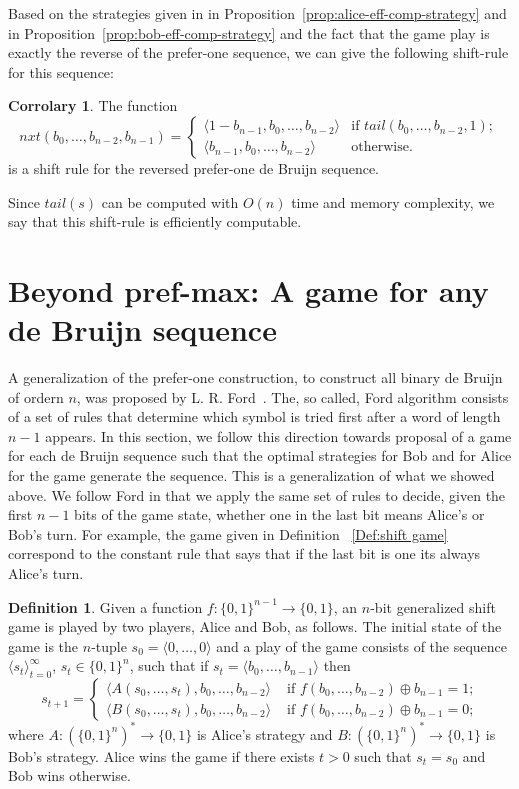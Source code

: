 \documentclass[final,12pt]{elsarticle}
\theoremstyle{definition} \newtheorem{definition}[theorem]{Definition} \newtheorem{observation}[theorem]{Observation} \newtheorem{example}[theorem]{Example} \newtheorem{remark}[theorem]{Remark} \newtheorem{corrolary}[theorem]{Corrolary}
\newcommand{\T}[1]{\langle{#1}\rangle} \DeclareMathOperator{\drop}{drop} \DeclareMathOperator{\dropbits}{drop\_bits} \DeclareMathOperator{\dropstates}{drop\_states} \DeclareMathOperator{\leadingForm}{LeadingForm} \DeclareMathOperator{\dv}{div} %
\begin{document}
Based on the strategies given in  in Proposition~\ref{prop:alice-eff-comp-strategy} and in Proposition~\ref{prop:bob-eff-comp-strategy} and the fact that the game play is exactly the reverse of the prefer-one sequence, we can give the following shift-rule for this sequence:

\begin{corrolary}
The function
$$nxt(b_0,\dots,b_{n-2},b_{n-1})=\begin{cases}
	\T{1-b_{n-1},b_0,\dots,b_{n-2}} & \text{if } tail(b_0,\dots,b_{n-2},1); \\
	\T{b_{n-1},b_0,\dots,b_{n-2}} & \text{otherwise.}
\end{cases}$$
is a shift rule for the reversed prefer-one de Bruijn sequence.
\end{corrolary}


Since $tail(s)$ can be computed with $O(n)$ time and memory complexity, we say that this shift-rule is efficiently computable.

\section{Beyond pref-max: A game for any de Bruijn sequence} 
\label{sec:games-for-all-DB-seq}

A generalization of the prefer-one construction, to construct all binary de Bruijn of ordern $n$, was proposed by L. R. Ford~\cite{ford1957cyclic}. The, so called, Ford algorithm consists of a set of rules that determine which symbol is tried first after a word of length $n-1$ appears. In this section, we follow this direction towards proposal of a game for each de Bruijn sequence such that the optimal strategies for Bob and for Alice for the game generate the sequence. This is a generalization of what we showed above. We follow Ford in that we apply the same set of rules to decide, given the first $n-1$ bits of the game state, whether one in the last bit means Alice's or Bob's turn. For example, the game given in Definition~   \ref{Def:shift game} correspond to the constant rule that says that if the last bit is one its always Alice's turn.

\begin{definition}
	\label{Def:generalized-shift game} Given a function $f\colon \{0,1\}^{n-1} \to \{0,1\}$, an $n$-bit generalized shift game is played by two players, Alice and Bob, as follows. The initial state of the game is the $n$-tuple $s_0=
		\T{0,\dots,0}$ and a play of the game consists of the sequence $
		\T{s_t }_{t=0}^\infty$, $s_t \in \{0,1\}^n$, such that if $s_t=
		\T{b_0, \dots, b_{n-1}}$ then $$s_{t+1} =
		\begin{cases}
			\T{ A(s_0,\dots,s_t), b_0, \dots, b_{n-2}} & \text{ if $f(b_0,\dots,b_{n-2}) \oplus b_{n-1} = 1$;} \\
			\T{ B(s_0,\dots,s_t), b_0, \dots, b_{n-2}} & \text{ if $f(b_0,\dots,b_{n-2}) \oplus b_{n-1} = 0$;}
		\end{cases}
	$$ where $A\colon(\{0,1\}^n)^* \to \{0,1\}$ is Alice's strategy and $B\colon (\{0,1\}^n)^* \to \{0,1\}$ is Bob's strategy. Alice wins the game if there exists $t>0$ such that $s_t=s_0$ and Bob wins otherwise.
\end{definition}
\end{document}
